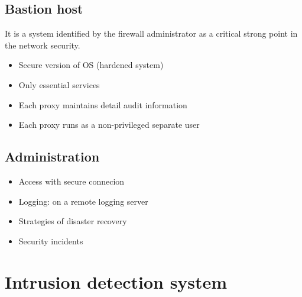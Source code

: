 \documentclass[10pt,a4paper]{book}
\begin{document}
\section{Bastion host}
It is a system identified by the firewall administrator as a critical strong point in the network security.
\begin{itemize}
\item Secure version of OS (hardened system)
\item Only essential services
\item Each proxy maintains detail audit information
\item Each proxy runs as a non-privileged separate user
\end{itemize}
\section{Administration}
\begin{itemize}
\item Access with secure connecion
\item Logging: on a remote logging server
\item Strategies of disaster recovery
\item Security incidents
\end{itemize}
\chapter{Intrusion detection system}
\end{document}
